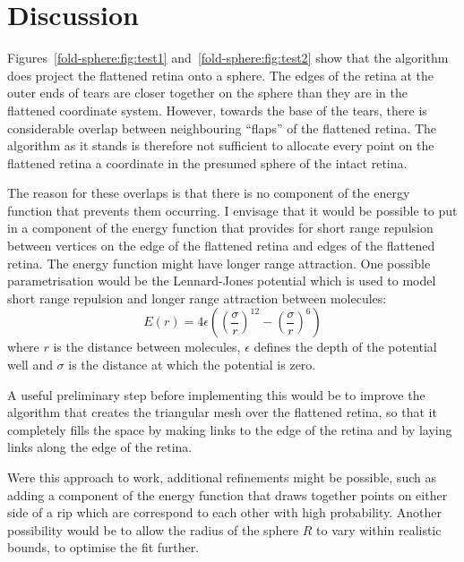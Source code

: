 \documentclass{article}
\begin{document}
\section{Discussion}
\label{fold-retina:sec:discussion}

Figures~\ref{fold-sphere:fig:test1} and~\ref{fold-sphere:fig:test2}
show that the algorithm does project the flattened retina onto a
sphere. The edges of the retina at the outer ends of tears are closer
together on the sphere than they are in the flattened coordinate
system. However, towards the base of the tears, there is considerable
overlap between neighbouring ``flaps'' of the flattened retina. The
algorithm as it stands is therefore not sufficient to allocate every
point on the flattened retina a coordinate in the presumed sphere of
the intact retina.

The reason for these overlaps is that there is no component of the
energy function that prevents them occurring. I envisage that it would
be possible to put in a component of the energy function that provides
for short range repulsion between vertices on the edge of the
flattened retina and edges of the flattened retina. The energy
function might have longer range attraction. One possible
parametrisation would be the Lennard-Jones potential which is used to
model short range repulsion and longer range attraction between
molecules:
\begin{equation}
  \label{fold-sphere:eq:4}
  E(r) = 4\epsilon\left(\left(\frac{\sigma}{r}\right)^{12}-
    \left(\frac{\sigma}{r}\right)^{6}\right)
\end{equation}
where $r$ is the distance between molecules, $\epsilon$ defines the
depth of the potential well and $\sigma$ is the distance at which the
potential is zero.

A useful preliminary step before implementing this would be to improve
the algorithm that creates the triangular mesh over the flattened
retina, so that it completely fills the space by making links to the
edge of the retina and by laying links along the edge of the retina.

Were this approach to work, additional refinements might be possible,
such as adding a component of the energy function that draws together
points on either side of a rip which are correspond to each other with
high probability. Another possibility would be to allow the radius of
the sphere $R$ to vary within realistic bounds, to optimise the fit
further.



\end{document}

